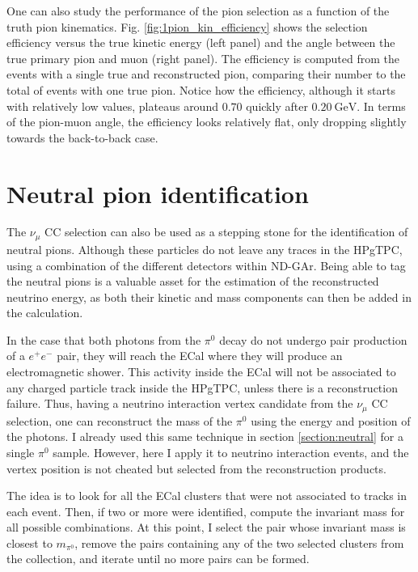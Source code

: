 One can also study the performance of the pion selection as a function of the truth pion kinematics. Fig. \ref{fig:1pion_kin_efficiency} shows the selection efficiency versus the true kinetic energy (left panel) and the angle between the true primary pion and muon (right panel). The efficiency is computed from the events with a single true and reconstructed pion, comparing their number to the total of events with one true pion. Notice how the efficiency, although it starts with relatively low values, plateaus around $0.70$ quickly after $0.20~\mathrm{GeV}$. In terms of the pion-muon angle, the efficiency looks relatively flat, only dropping slightly towards the back-to-back case.

\section{Neutral pion identification}

The $\nu_{\mu}$ CC selection can also be used as a stepping stone for the identification of neutral pions. Although these particles do not leave any traces in the HPgTPC, using a combination of the different detectors within ND-GAr. Being able to tag the neutral pions is a valuable asset for the estimation of the reconstructed neutrino energy, as both their kinetic and mass components can then be added in the calculation.

In the case that both photons from the $\pi^{0}$ decay do not undergo pair production of a $e^{+}e^{-}$ pair, they will reach the ECal where they will produce an electromagnetic shower. This activity inside the ECal will not be associated to any charged particle track inside the HPgTPC, unless there is a reconstruction failure. Thus, having a neutrino interaction vertex candidate from the $\nu_{\mu}$ CC selection, one can reconstruct the mass of the $\pi^{0}$ using the energy and position of the photons. I already used this same technique in section \ref{section:neutral} for a single $\pi^{0}$ sample. However, here I apply it to neutrino interaction events, and the vertex position is not cheated but selected from the reconstruction products.

The idea is to look for all the ECal clusters that were not associated to tracks in each event. Then, if two or more were identified, compute the invariant mass for all possible combinations. At this point, I select the pair whose invariant mass is closest to $m_{\pi^{0}}$, remove the pairs containing any of the two selected clusters from the collection, and iterate until no more pairs can be formed.

